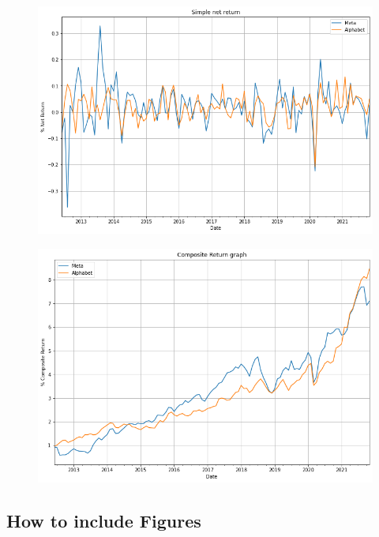 \documentclass{article}
\begin{document}
\begin{figure}[h]
    \centering
    \begin{minipage}{.5\textwidth}
      \centering
      \includegraphics[width=1\linewidth]{tecno_rendimenti_semplici_netti.png}
      \label{fig:rendimenti_semplici_tecno}
    \end{minipage}%
    \begin{minipage}{.5\textwidth}
      \centering
      \includegraphics[width=.97\linewidth]{tecno_rendimenti_composti.png}
      \label{fig:rendimenti_compositi_tecno}
    \end{minipage}
    \end{figure}


\subsection{How to include Figures}
\end{document}
